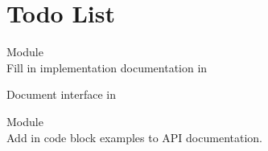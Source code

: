 \chapter{Todo List}
\hypertarget{todo}{}\label{todo}

\begin{DoxyRefList}
\item[Module \doxylink{group___b_m_p581}{BMP581} ]\hfill \\
\label{todo__todo000001}%
%
Fill in implementation documentation in  



Document interface in 


\item[Module \doxylink{group___s_p_i}{SPI} ]\hfill \\
\label{todo__todo000002}%
%
Add in code block examples to API documentation.


\end{DoxyRefList}